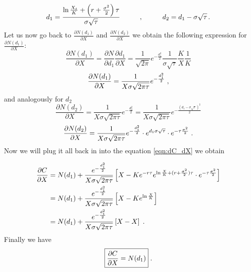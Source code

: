 \documentclass[times, utf8, diplomski]{fer}
\begin{document}
\begin{equation*}
	d_1 = \frac{\ln{\frac{X_t}{K}} + \left(r + \frac{\sigma^2}{2} \right)\tau}{\sigma\sqrt{\tau}} \hspace{1cm} , \hspace{1cm} d_2 = d_1 - \sigma\sqrt{\tau} \hspace{0.05cm}.
\end{equation*} Let us now go back to $\frac{\partial N(d_1)}{\partial X}$ and $\frac{\partial N(d_2)}{\partial X}$ we obtain the following expression for $\frac{\partial N(d_1)}{\partial X}$:
\begin{equation*}
	\frac{\partial N(d_1)}{\partial X} = \frac{\partial N}{\partial d_1} \frac{\partial d_1}{\partial X} = \frac{1}{\sqrt{2\pi}}e^{-\frac{d_1^2}{2}}\frac{1}{\sigma\sqrt{\tau}}\frac{K}{X}\frac{1}{K}
\end{equation*}
\begin{equation}
	\frac{\partial N(d_1)}{\partial X} = \frac{1}{X\sigma\sqrt{2\pi\tau}}e^{-\frac{d_1^2}{2}} \hspace{0.1cm},
\end{equation} and analogously for $d_2$
\begin{equation*}
	\frac{\partial N(d_2)}{\partial X} = \frac{1}{X\sigma\sqrt{2\pi\tau}}e^{-\frac{d_2^2}{2}} = \frac{1}{X\sigma\sqrt{2\pi\tau}}e^{-\frac{(d_1 - \sigma\sqrt{\tau})^2}{2}}
\end{equation*}
\begin{equation}
	\frac{\partial N(d_2)}{\partial X} = \frac{1}{X\sigma\sqrt{2\pi\tau}}e^{-\frac{d_1^2}{2}} \cdot e^{d_1\sigma\sqrt{\tau}} \cdot e^{-\tau\frac{\sigma^2}{2}} \hspace{0.1cm}.
\end{equation} Now we will plug it all back in into the equation \ref{eqn:dC_dX} we obtain

\begin{align*}
	\frac{\partial C}{\partial X} &= N(d_1) + \frac{e^{-\frac{d_1^2}{2}}}{X\sigma\sqrt{2\pi\tau}} \left[ X - Ke^{-r\tau} e^{\ln{\frac{X}{K}} + (r+\frac{\sigma^2}{2})\tau} \cdot e^{-\tau\frac{\sigma^2}{2}} \right] \\
	&= N(d_1) + \frac{e^{-\frac{d_1^2}{2}}}{X\sigma\sqrt{2\pi\tau}} \left[ X - Ke^{\ln{\frac{X}{K}}} \right] \\
	&= N(d_1) + \frac{e^{-\frac{d_1^2}{2}}}{X\sigma\sqrt{2\pi\tau}} \left[ X - X \right] \hspace{0.1cm}.
\end{align*}
Finally we have
\begin{equation}
	\boxed{
		\frac{\partial C}{\partial X} = N(d_1)
	} \hspace{0.1cm}.
\end{equation}
\end{document}
